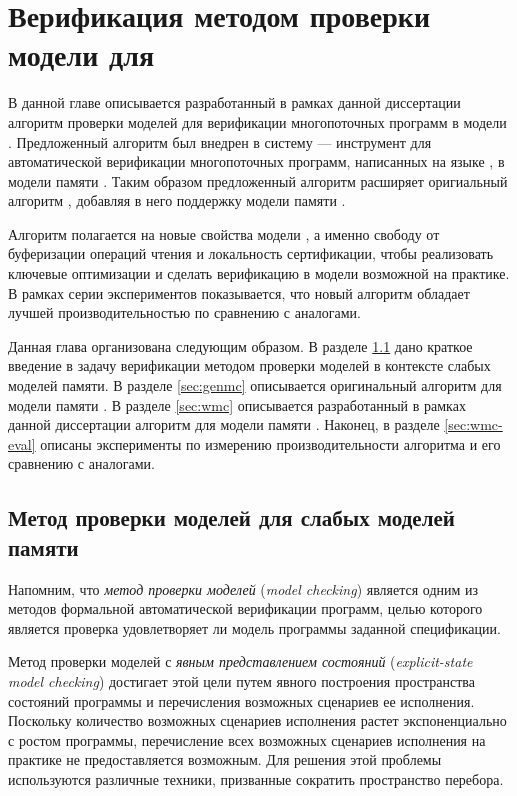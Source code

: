 \chapter{Верификация методом проверки модели для \WkmS}
\label{ch:mc-weakestmo2}

В данной главе описывается разработанный в рамках данной диссертации 
алгоритм проверки моделей \wmc для верификации 
многопоточных программ в модели \WkmS.
Предложенный алгоритм был внедрен в систему \genmc --- 
инструмент для автоматической верификации многопоточных программ, 
написанных на языке \CLANG, в модели памяти \RCMM. 
Таким образом предложенный алгоритм \wmc расширяет 
оригиальный алгоритм \genmc, добавляя в него 
поддержку модели памяти \WkmS.  

Алгоритм \wmc полагается на новые свойства модели \WkmS, 
а именно свободу от буферизации операций чтения и 
локальность сертификации, чтобы реализовать ключевые 
оптимизации и сделать верификацию в модели \WkmS возможной на практике.  
В рамках серии экспериментов показывается, что 
новый алгоритм \wmc обладает лучшей производительностью 
по сравнению с аналогами.

Данная глава организована следующим образом. 
В разделе \ref{sec:mc-wmm} дано краткое введение 
в задачу верификации методом проверки моделей 
в контексте слабых моделей памяти.
В разделе \ref{sec:genmc} описывается оригинальный алгоритм 
\genmc для модели памяти \RCMM.
В разделе \ref{sec:wmc} описывается разработанный в 
рамках данной диссертации алгоритм \wmc для модели памяти \WkmS.
Наконец, в разделе \ref{sec:wmc-eval} описаны эксперименты 
по измерению производительности алгоритма \wmc и его сравнению с аналогами.

\section{Метод проверки моделей для слабых моделей памяти}
\label{sec:mc-wmm}

Напомним, что \emph{метод проверки моделей} (\emph{model checking}) 
является одним из методов формальной автоматической верификации программ,
целью которого является проверка удовлетворяет ли 
модель программы заданной спецификации. 

Метод проверки моделей с \emph{явным представлением состояний} 
(\emph{explicit-state model checking}) достигает 
этой цели путем явного построения пространства состояний программы 
и перечисления возможных сценариев ее исполнения.
Поскольку количество возможных сценариев исполнения 
растет экспоненциально с ростом программы, 
перечисление всех возможных сценариев исполнения 
на практике не предоставляется возможным. 
Для решения этой проблемы используются различные техники, 
призванные сократить пространство перебора. 

